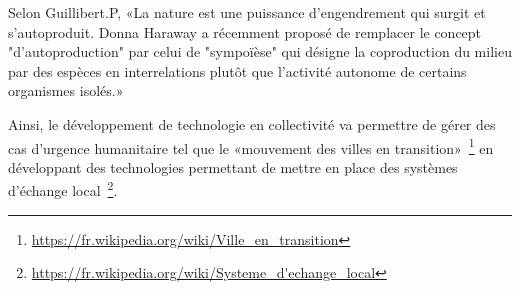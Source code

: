 Selon Guillibert.P, «La nature est une puissance d’engendrement qui surgit et s’autoproduit. Donna Haraway a récemment proposé de remplacer le concept "d’autoproduction" par celui de "sympoïèse" qui désigne la coproduction du milieu par des espèces en interrelations plutôt que l’activité autonome de certains organismes isolés.»~\cite{guillibert:tel-02929676}

Ainsi, le développement de technologie en collectivité va permettre de gérer des cas d'urgence humanitaire tel que le «mouvement des villes en transition»~\cite{MOUV_063_0130}\footnote{\url{https://fr.wikipedia.org/wiki/Ville_en_transition}} en développant des technologies permettant de mettre en place des systèmes d'échange local~\cite{cibois2010compte}\footnote{\url{https://fr.wikipedia.org/wiki/Systeme_d'echange_local}}.







